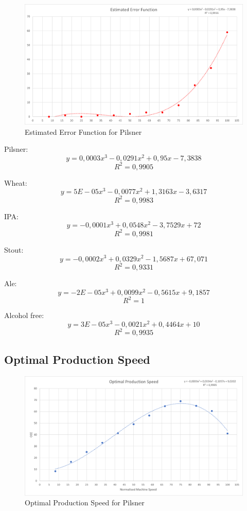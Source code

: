 \begin{figure}[ht]
	\centering
	\includegraphics[width=1\linewidth]{images/errorfunction/pilsner.png}
	\caption{Estimated Error Function for Pilsner}
	\label{figure:ef_pilsner}
\end{figure}

Pilsner:\\
\[y = 0,0003x^3 - 0,0291x^2 + 0,95x - 7,3838\]
\[R^2 = 0,9905\]

Wheat:\\
\[y = 5E-05x^3 - 0,0077x^2 + 1,3163x - 3,6317\]
\[R^2 = 0,9983\]

IPA:\\
\[y = -0,0001x^3 + 0,0548x^2 - 3,7529x + 72\]
\[R^2 = 0,9981\]

Stout:\\
\[y = -0,0002x^3 + 0,0329x^2 - 1,5687x + 67,071\]
\[R^2 = 0,9331\]

Ale:\\
\[y = -2E-05x^3 + 0,0099x^2 - 0,5615x + 9,1857\]
\[R^2 = 1\]

Alcohol free:\\
\[y = 3E-05x^3 - 0,0021x^2 + 0,4464x + 10\]
\[R^2 = 0,9935\]

\subsection{Optimal Production Speed}

\begin{figure}[ht]
	\centering
	\includegraphics[width=1\linewidth]{images/ops/pilsner.png}
	\caption{Optimal Production Speed for Pilsner}
	\label{figure:ops_pilsner}
\end{figure}

